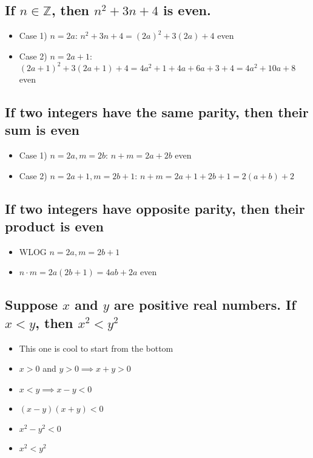 \documentclass[11pt, oneside]{amsart}
\begin{document}
\subsection{If \(n \in \mathbb{Z}\), then \(n^2+3n+4\) is even.}
\label{sec:orgfb4e912}
\begin{itemize}
\item Case 1) \(n=2a\): \(n^2+3n+4 = (2a)^2+3(2a)+4\) even
\item Case 2) \(n=2a+1\): \((2a+1)^2+3(2a+1)+4 = 4a^2+1+4a+6a+3+4 = 4a^2+10a+8\) even
\end{itemize}

\subsection{If two integers have the same parity, then their sum is even}
\label{sec:org05786f8}
\begin{itemize}
\item Case 1) \(n=2a, m=2b\): \(n+m = 2a+2b\) even
\item Case 2) \(n=2a+1, m=2b+1\): \(n+m = 2a+1+2b+1 = 2(a+b)+2\)
\end{itemize}

\subsection{If two integers have opposite parity, then their product is even}
\label{sec:org184c223}
\begin{itemize}
\item WLOG \(n=2a, m=2b+1\)
\item \(n \cdot m = 2a(2b+1) = 4ab+2a\) even
\end{itemize}

\subsection{Suppose \(x\) and \(y\) are positive real numbers.  If \(x<y\), then \(x^2<y^2\)}
\label{sec:orge019635}
\begin{itemize}
\item This one is cool to start from the bottom
\item \(x>0\) and \(y>0 \implies x+y>0\)
\item \(x<y \implies x-y<0\)
\item \((x-y)(x+y)<0\)
\item \(x^2-y^2<0\)
\item \(x^2<y^2\)
\end{itemize}
\end{document}
